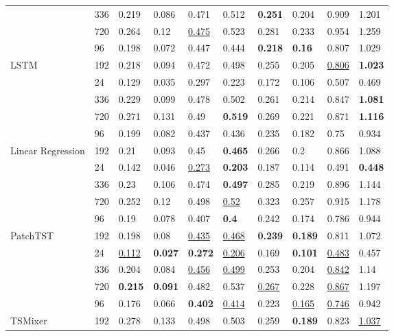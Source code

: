\begin{tabular}{llllllllll}
 & 336 & 0.219 & 0.086 & 0.471 & 0.512 & \textbf{0.251} & 0.204 & 0.909 & 1.201 \\
 & 720 & 0.264 & 0.12 & \underline{0.475} & 0.523 & 0.281 & 0.233 & 0.954 & 1.259 \\
 & 96 & 0.198 & 0.072 & 0.447 & 0.444 & \textbf{0.218} & \textbf{0.16} & 0.807 & 1.029 \\
\cline{1-10}
\multirow[t]{5}{*}{LSTM} & 192 & 0.218 & 0.094 & 0.472 & 0.498 & 0.255 & 0.205 & \underline{0.806} & \textbf{1.023} \\
 & 24 & 0.129 & 0.035 & 0.297 & 0.223 & 0.172 & 0.106 & 0.507 & 0.469 \\
 & 336 & 0.229 & 0.099 & 0.478 & 0.502 & 0.261 & 0.214 & 0.847 & \textbf{1.081} \\
 & 720 & 0.271 & 0.131 & 0.49 & \textbf{0.519} & 0.269 & 0.221 & 0.871 & \textbf{1.116} \\
 & 96 & 0.199 & 0.082 & 0.437 & 0.436 & 0.235 & 0.182 & 0.75 & 0.934 \\
\cline{1-10}
\multirow[t]{5}{*}{Linear Regression} & 192 & 0.21 & 0.093 & 0.45 & \textbf{0.465} & 0.266 & 0.2 & 0.866 & 1.088 \\
 & 24 & 0.142 & 0.046 & \underline{0.273} & \textbf{0.203} & 0.187 & 0.114 & 0.491 & \textbf{0.448} \\
 & 336 & 0.23 & 0.106 & 0.474 & \textbf{0.497} & 0.285 & 0.219 & 0.896 & 1.144 \\
 & 720 & 0.252 & 0.12 & 0.498 & \underline{0.52} & 0.323 & 0.257 & 0.915 & 1.178 \\
 & 96 & 0.19 & 0.078 & 0.407 & \textbf{0.4} & 0.242 & 0.174 & 0.786 & 0.944 \\
\cline{1-10}
\multirow[t]{5}{*}{PatchTST} & 192 & 0.198 & 0.08 & \underline{0.435} & \underline{0.468} & \textbf{0.239} & \textbf{0.189} & 0.811 & 1.072 \\
 & 24 & \underline{0.112} & \textbf{0.027} & \textbf{0.272} & \underline{0.206} & 0.169 & \textbf{0.101} & \underline{0.483} & 0.457 \\
 & 336 & 0.204 & 0.084 & \underline{0.456} & \underline{0.499} & 0.253 & 0.204 & \underline{0.842} & 1.14 \\
 & 720 & \textbf{0.215} & \textbf{0.091} & 0.482 & 0.537 & \underline{0.267} & 0.228 & \underline{0.867} & 1.197 \\
 & 96 & 0.176 & 0.066 & \textbf{0.402} & \underline{0.414} & 0.223 & \underline{0.165} & \underline{0.746} & 0.942 \\
\cline{1-10}
\multirow[t]{5}{*}{TSMixer} & 192 & 0.278 & 0.133 & 0.498 & 0.503 & 0.259 & \textbf{0.189} & 0.823 & \underline{1.037} \\

\end{tabular}
